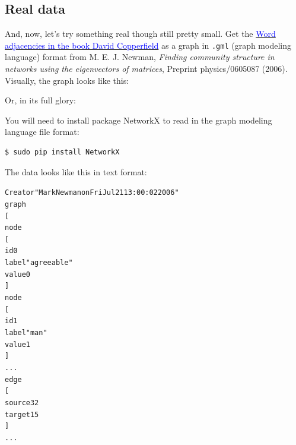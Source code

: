 \begin{fullwidth}
\section{Real data}

And, now, let's try something real though still pretty small. Get the \href{http://www-personal.umich.edu/~mejn/netdata/adjnoun.zip}{\textcolor{blue}{Word adjacencies in the book David Copperfield}} as a graph in {\tt .gml} (graph modeling language) format from M. E. J. Newman, {\em Finding community structure in networks using the eigenvectors of matrices}, Preprint physics/0605087 (2006). Visually, the graph looks like this:

\begin{center}
\end{center}

\noindent Or, in its full glory:

\begin{center}
\end{center}

You will need to install package NetworkX to read in the graph modeling language file format:

\begin{lstlisting}[style=BashInputStyle]
$ sudo pip install NetworkX
\end{lstlisting}

\noindent The data looks like this in text format:

\begin{alltt}\small
Creator "Mark Newman on Fri Jul 21 13:00:02 2006"
graph
[
  node
  [
    id 0
    label "agreeable"
    value 0
  ]
  node
  [
    id 1
    label "man"
    value 1
  ]
...
  edge
  [
    source 32
    target 15
  ]
...
\end{alltt}


\end{fullwidth}
